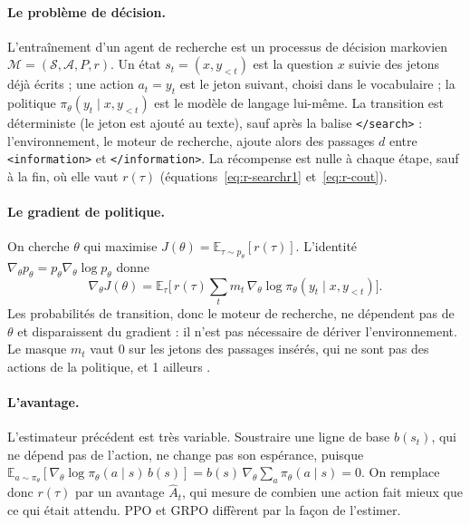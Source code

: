 \documentclass[11pt,a4paper]{article}
\begin{document}
\paragraph{Le problème de décision.} L'entraînement d'un agent de recherche est un processus de décision markovien $\mathcal{M} = (\mathcal{S}, \mathcal{A}, P, r)$. Un état $s_t = (x, y_{<t})$ est la question $x$ suivie des jetons déjà écrits ; une action $a_t = y_t$ est le jeton suivant, choisi dans le vocabulaire ; la politique $\pi_\theta(y_t \mid x, y_{<t})$ est le modèle de langage lui-même. La transition est déterministe (le jeton est ajouté au texte), sauf après la balise \texttt{</search>} : l'environnement, le moteur de recherche, ajoute alors des passages $d$ entre \texttt{<information>} et \texttt{</information>}. La récompense est nulle à chaque étape, sauf à la fin, où elle vaut $r(\tau)$ (équations~\ref{eq:r-searchr1} et~\ref{eq:r-cout}).

\paragraph{Le gradient de politique.} On cherche $\theta$ qui maximise $J(\theta) = \mathbb{E}_{\tau \sim p_\theta}[r(\tau)]$. L'identité $\nabla_\theta p_\theta = p_\theta \nabla_\theta \log p_\theta$ donne
\begin{equation}
\nabla_\theta J(\theta) = \mathbb{E}_{\tau}\Big[\, r(\tau) \sum_t m_t \, \nabla_\theta \log \pi_\theta(y_t \mid x, y_{<t}) \Big].
\end{equation}
Les probabilités de transition, donc le moteur de recherche, ne dépendent pas de $\theta$ et disparaissent du gradient : il n'est pas nécessaire de dériver l'environnement. Le masque $m_t$ vaut 0 sur les jetons des passages insérés, qui ne sont pas des actions de la politique, et 1 ailleurs \citep{jin2025search}.

\paragraph{L'avantage.} L'estimateur précédent est très variable. Soustraire une ligne de base $b(s_t)$, qui ne dépend pas de l'action, ne change pas son espérance, puisque $\mathbb{E}_{a \sim \pi_\theta}[\nabla_\theta \log \pi_\theta(a \mid s)\, b(s)] = b(s)\, \nabla_\theta \sum_a \pi_\theta(a \mid s) = 0$. On remplace donc $r(\tau)$ par un avantage $\hat{A}_t$, qui mesure de combien une action fait mieux que ce qui était attendu. PPO et GRPO diffèrent par la façon de l'estimer.
\end{document}
